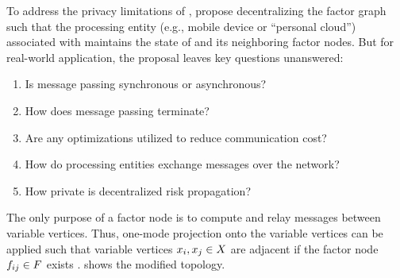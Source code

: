 To address the privacy limitations of \cRiskPropagation{}, \citet{Ayday2021} propose decentralizing the factor graph such that the processing entity (e.g., mobile device or ``personal cloud'') associated with  maintains the state of  and its neighboring factor nodes. But for real-world application, the proposal leaves key questions unanswered:
\begin{enumerate}
  \item Is message passing synchronous or asynchronous?
  \item How does message passing terminate?
  \item Are any optimizations utilized to reduce communication cost?
  \item How do processing entities exchange messages over the network?
  \item How private is decentralized risk propagation?
\end{enumerate}

%

The only purpose of a factor node is to compute and relay messages between variable vertices. Thus, one-mode projection onto the variable vertices can be applied such that variable vertices $\vVariable[i],\vVariable[j] \in \vVariables$ are adjacent if the factor node $\vFactor[ij] \in \vFactors$ exists \citep{Zhou2007}.  shows the modified topology.

